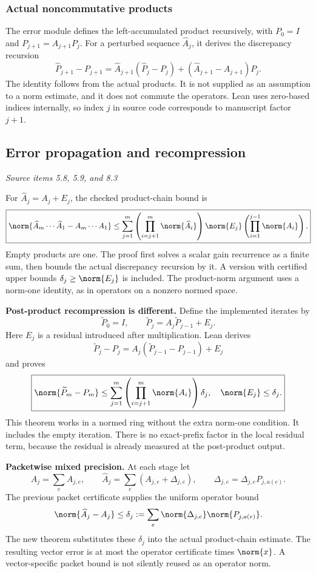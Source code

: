 \subsubsection{Actual noncommutative products}
The error module defines the left-accumulated product recursively, with $P_0=I$ and $P_{j+1}=A_{j+1}P_j$. For a perturbed sequence $\widehat A_j$, it derives the discrepancy recursion
\[
\widehat P_{j+1}-P_{j+1}
=\widehat A_{j+1}(\widehat P_j-P_j)
 +(\widehat A_{j+1}-A_{j+1})P_j.
\]
The identity follows from the actual products. It is not supplied as an assumption to a norm estimate, and it does not commute the operators. Lean uses zero-based indices internally, so index $j$ in source code corresponds to manuscript factor $j+1$.



\subsection{Error propagation and recompression}\label{supp3:subsection:002}\textit{Source items 5.8, 5.9, and 8.3}\par
For $\widehat A_j=A_j+E_j$, the checked product-chain bound is
\[
\boxed{
\norm{\widehat A_m\cdots\widehat A_1-A_m\cdots A_1}
\leq\sum_{j=1}^m
 \left(\prod_{i=j+1}^m\norm{\widehat A_i}\right)
 \norm{E_j}
 \left(\prod_{i=1}^{j-1}\norm{A_i}\right).}
\]
Empty products are one. The proof first solves a scalar gain recurrence as a finite sum, then bounds the actual discrepancy recursion by it. A version with certified upper bounds $\delta_j\geq\norm{E_j}$ is included. The product-norm argument uses a norm-one identity, as in operators on a nonzero normed space.

\textbf{Post-product recompression is different.} Define the implemented iterates by
\[
\widetilde P_0=I,\qquad
\widetilde P_j=A_j\widetilde P_{j-1}+E_j.
\]
Here $E_j$ is a residual introduced after multiplication. Lean derives
\[
\widetilde P_j-P_j=A_j(\widetilde P_{j-1}-P_{j-1})+E_j
\]
and proves
\[
\boxed{\norm{\widetilde P_m-P_m}
\leq\sum_{j=1}^m\left(\prod_{i=j+1}^m\norm{A_i}\right)\delta_j,
\quad \norm{E_j}\leq\delta_j.}
\]
This theorem works in a normed ring without the extra norm-one condition. It includes the empty iteration. There is no exact-prefix factor in the local residual term, because the residual is already measured at the post-product output.

\textbf{Packetwise mixed precision.} At each stage let
\[
A_j=\sum_e A_{j,e},\qquad
\widehat A_j=\sum_e(A_{j,e}+\Delta_{j,e}),\qquad
\Delta_{j,e}=\Delta_{j,e}P_{j,a(e)}.
\]
The previous packet certificate supplies the uniform operator bound
\[
\norm{\widehat A_j-A_j}\leq
\delta_j:=\sum_e\norm{\Delta_{j,e}}\norm{P_{j,a(e)}}.
\]
The new theorem substitutes these $\delta_j$ into the actual product-chain estimate. The resulting vector error is at most the operator certificate times $\norm{x}$. A vector-specific packet bound is not silently reused as an operator norm.

